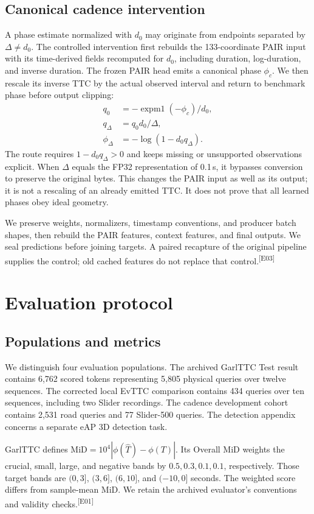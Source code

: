 \documentclass[twocolumn,letterpaper]{article}
\newcommand{\evid}[1]{\textsuperscript{\textsf{[#1]}}}
\begin{document}
\subsection{Canonical cadence intervention}
A phase estimate normalized with $d_0$ may originate from endpoints separated by $\Delta\neq d_0$. The controlled intervention first rebuilds the 133-coordinate PAIR input with its time-derived fields recomputed for $d_0$, including duration, log-duration, and inverse duration. The frozen PAIR head emits a canonical phase $\phi_c$. We then rescale its inverse TTC by the actual observed interval and return to benchmark phase before output clipping:
\begin{align}
 q_0&=-\operatorname{expm1}(-\phi_c)/d_0,\\
 q_\Delta&=q_0d_0/\Delta,\\
 \phi_\Delta&=-\log(1-d_0q_\Delta).
\label{eq:cadence}
\end{align}
The route requires $1-d_0q_\Delta>0$ and keeps missing or unsupported observations explicit. When $\Delta$ equals the FP32 representation of 0.1\,s, it bypasses conversion to preserve the original bytes. This changes the PAIR input as well as its output; it is not a rescaling of an already emitted TTC. It does not prove that all learned phases obey ideal geometry.

We preserve weights, normalizers, timestamp conventions, and producer batch shapes, then rebuild the PAIR features, context features, and final outputs. We seal predictions before joining targets. A paired recapture of the original pipeline supplies the control; old cached features do not replace that control.\evid{E03}

\section{Evaluation protocol}
\subsection{Populations and metrics}
We distinguish four evaluation populations. The archived GarlTTC Test result contains 6,762 scored tokens representing 5,805 physical queries over twelve sequences. The corrected local EvTTC comparison contains 434 queries over ten sequences, including two Slider recordings. The cadence development cohort contains 2,531 road queries and 77 Slider-500 queries. The detection appendix concerns a separate eAP 3D detection task.

GarlTTC defines $\mathrm{MiD}=10^4|\phi(\widehat T)-\phi(T)|$. Its Overall MiD weights the crucial, small, large, and negative bands by $0.5,0.3,0.1,0.1$, respectively. Those target bands are $(0,3]$, $(3,6]$, $(6,10]$, and $(-10,0]$ seconds. The weighted score differs from sample-mean MiD. We retain the archived evaluator's conventions and validity checks.\evid{E01}
\end{document}
